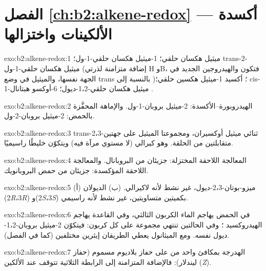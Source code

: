 \section*{الفصل \ref{ch:b2:alkene-redox} --- أكسدة الألكينات واختزالها}

\begin{solution}{exo:b2:alkene-redox:1}
ميثيل هكسان حلقي؛ 1-ميثيل هكسان حلقي-1-ول؛ trans-2-ميثيل هكسان حلقي-1-ول (إضافة متزامنة لذرتي H
وB، فتكون  والهيدروجين الجديد في الجهة نفسها، والميثيل في وضع trans بالنسبة إلى )؛
أكسيد 1-ميثيل هكسين حلقي؛ cis-1-ميثيل هكسان حلقي-1،2-ديول؛ 6-أوكسو هبتانال
.
\end{solution}

\begin{solution}{exo:b2:alkene-redox:2}
الهيدروبورة--الأكسدة: 2-ميثيل بروبان-1-ول. والإماهة المحفَّزة بالحمض:
2-ميثيل بروبان-2-ول.
\end{solution}

\begin{solution}{exo:b2:alkene-redox:3}
trans-2،3-ثنائي ميثيل أوكسيران، ومجموعتا الميثيل على جهتين متقابلتين من الحلقة. وهو كيرالي (لا
مستوي مرآة فيه) ويتكوّن خليطًا راسيميًا.
\end{solution}

\begin{solution}{exo:b2:alkene-redox:4}
المعالجة اللاحقة المختزلة: جزيئان من البروبانال. والمعالجة اللاحقة المؤكسدة: جزيئان من حمض
البروبانويك.
\end{solution}

\begin{solution}{exo:b2:alkene-redox:5}
(أ) ميزو-بوتان-2،3-ديول، غير نشط لأنه لاكيرالي. (ب) الديولان
(2\textit{R}،3\textit{R}) و(2\textit{S}،3\textit{S}) بكميتين متساويتين، غير نشط
لأنه راسيمي.
\end{solution}

\begin{solution}{exo:b2:alkene-redox:6}
في الحمض يهاجم الماء الكربون الثالثي، وفي القاعدة يهاجم الهيدروكسيد ؛ وفي
الحالتين تنتهي مجموعة  على كل كربون: فيتكوّن 2-ميثيل بروبان-1،2-ديول نفسه. ومع الميثانول يعطي
الطريقان إيثرين مختلفين (كما في الفصل).
\end{solution}

\begin{solution}{exo:b2:alkene-redox:7}
الهدرجة بمكافئ واحد من  على حفاز بلاديوم مسموم
(حفاز ليندلار): فالإضافة المتزامنة إلى الرابطة الثلاثية تتوقف عند الألكين (\textit{Z}).
\end{solution}

